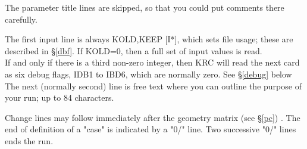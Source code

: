 \documentclass{article}
\newcommand{\qi}{\\ \hspace*{2.em}}      %
\begin{document}
The parameter title lines are skipped, so that you could put comments there
carefully.

The first input line is always KOLD,KEEP [I*], which sets file usage; these are
described in \S \ref{dbf}. If KOLD=0, then a full set of input values is read.
\qi If and only if there is a third non-zero integer, then KRC will read the next
card as six debug flags, IDB1 to IBD6, which are normally zero.
  See \S \ref{debug} below \\
The next (normally second) line is free text where you can outline the purpose 
of your run; up to 84 characters.

Change lines may follow immediately after the geometry matrix (see \S \ref{pc})
. The end of definition of a "case" is indicated by a "0/" line. Two successive
"0/" lines ends the run.
\end{document}
